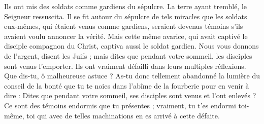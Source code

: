 Ils ont mis des soldats comme gardiens du sépulcre. La terre ayant tremblé, le Seigneur ressuscita. Il se fit autour du sépulcre de tels miracles que les soldats eux-mêmes, qui étaient venus comme gardiens, seraient devenus témoins s'ils avaient voulu annoncer la vérité. Mais cette même avarice, qui avait captivé le disciple compagnon du Christ, captiva aussi le soldat gardien. Nous vous donnons de l'argent, disent les Juifs ; mais dites que pendant votre sommeil, les disciples sont venus l'emporter. Ils ont vraiment défailli dans leurs multiples réflexions. Que dis-tu, ô malheureuse astuce ? As-tu donc tellement abandonné la lumière du conseil de la bonté que tu te noies dans l'abîme de la fourberie pour en venir à dire : Dites que pendant votre sommeil, ses disciples sont venus et l'ont enlevés ? Ce sont des témoins endormis que tu présentes ; vraiment, tu t'es endormi toi-même, toi qui avec de telles machinations en es arrivé à cette défaite.